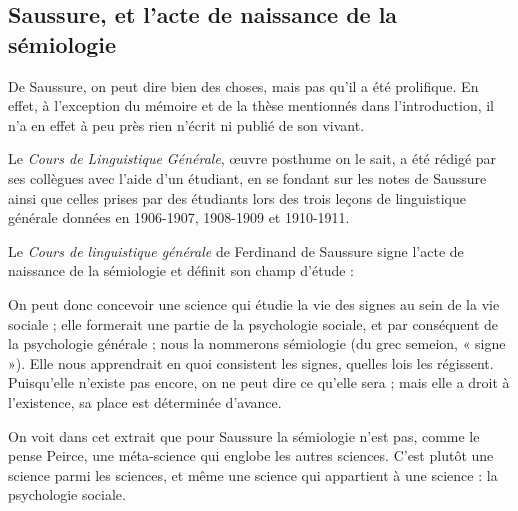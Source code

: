 \subsection{Saussure, et l’acte de naissance de la sémiologie}
De Saussure, on peut dire bien des choses, mais pas qu’il a été prolifique. En effet, à l’exception du mémoire et de la thèse mentionnés dans l’introduction, il n’a en effet à peu près rien n’écrit ni publié de son vivant.

Le \textit{Cours de Linguistique Générale}, œuvre posthume on le sait, a été rédigé par ses collègues avec l’aide d’un étudiant, en se fondant sur les notes de Saussure ainsi que celles prises par des étudiants lors des trois leçons de linguistique générale données en 1906-1907, 1908-1909 et 1910-1911.

Le \textit{Cours de linguistique générale} de Ferdinand de Saussure signe l’acte de naissance de la sémiologie et définit son champ d’étude :
\begin{lecture}{}
On peut donc concevoir une science qui étudie la vie des signes au sein de la vie sociale ; elle formerait une partie de la psychologie sociale, et par conséquent de la psychologie générale ; nous la nommerons sémiologie (du grec semeion, « signe »). Elle nous apprendrait en quoi consistent les signes, quelles lois les régissent. Puisqu’elle n’existe pas encore, on ne peut dire ce qu’elle sera ; mais elle a droit à l’existence, sa place est déterminée d’avance.
\end{lecture}
On voit dans cet extrait que pour Saussure la sémiologie n’est pas, comme le pense Peirce, une méta-science qui englobe les autres sciences. C’est plutôt une science parmi les sciences, et même une science qui appartient à une science : la psychologie sociale.

